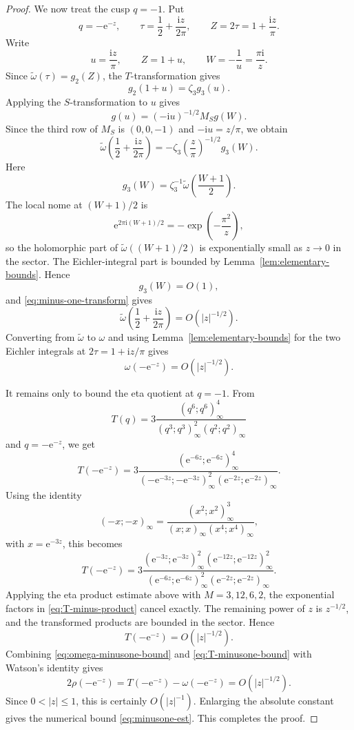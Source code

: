 \documentclass[10pt,a4paper]{amsart}
\newcommand{\ii}{\mathrm i}
\newcommand{\e}{\mathrm e}
\begin{document}
\begin{proof}
We now treat the cusp $q=-1$.  Put
\[
q=-\e^{-z},\qquad \tau=\frac12+\frac{\ii z}{2\pi},\qquad Z=2\tau=1+\frac{\ii z}{\pi}.
\]
Write
\[
u=\frac{\ii z}{\pi},\qquad Z=1+u,
\qquad W=-\frac1u=\frac{\pi\ii}{z}.
\]
Since $\widetilde\omega(\tau)=g_2(Z)$, the $T$-transformation gives
\[
g_2(1+u)=\zeta_3 g_3(u).
\]
Applying the $S$-transformation to $u$ gives
\[
g(u)=(-\ii u)^{-1/2}M_Sg(W).
\]
Since the third row of $M_S$ is $(0,0,-1)$ and $-\ii u=z/\pi$, we obtain
\begin{equation}\label{eq:minus-one-transform}
\widetilde\omega\left(\frac12+\frac{\ii z}{2\pi}\right)
= -\zeta_3\left(\frac{z}{\pi}\right)^{-1/2}g_3(W).
\end{equation}
Here
\[
g_3(W)=\zeta_3^{-1}\widetilde\omega\left(\frac{W+1}{2}\right).
\]
The local nome at $(W+1)/2$ is
\[
\e^{2\pi\ii(W+1)/2}=-\exp\left(-\frac{\pi^2}{z}\right),
\]
so the holomorphic part of $\widetilde\omega((W+1)/2)$ is exponentially small as
$z\to0$ in the sector.  The Eichler-integral part is bounded by Lemma~\ref{lem:elementary-bounds}.  Hence
\[
g_3(W)=O(1),
\]
and \eqref{eq:minus-one-transform} gives
\[
\widetilde\omega\left(\frac12+\frac{\ii z}{2\pi}\right)=O(|z|^{-1/2}).
\]
Converting from $\widetilde\omega$ to $\omega$ and using Lemma~\ref{lem:elementary-bounds} for the two Eichler integrals at $2\tau=1+\ii z/\pi$ gives
\begin{equation}\label{eq:omega-minusone-bound}
\omega(-\e^{-z})=O(|z|^{-1/2}).
\end{equation}

It remains only to bound the eta quotient at $q=-1$.  From
\[
T(q)=3\frac{(q^6;q^6)_\infty^4}{(q^3;q^3)_\infty^2(q^2;q^2)_\infty}
\]
and $q=-\e^{-z}$, we get
\[
T(-\e^{-z})
=3\frac{(\e^{-6z};\e^{-6z})_\infty^4}{(-\e^{-3z};-\e^{-3z})_\infty^2(\e^{-2z};\e^{-2z})_\infty}.
\]
Using the identity
\[
(-x;-x)_\infty=
\frac{(x^2;x^2)_\infty^3}{(x;x)_\infty(x^4;x^4)_\infty},
\]
with $x=\e^{-3z}$, this becomes
\begin{equation}\label{eq:T-minus-product}
T(-\e^{-z})
=
3\frac{(\e^{-3z};\e^{-3z})_\infty^2(\e^{-12z};\e^{-12z})_\infty^2}{(\e^{-6z};\e^{-6z})_\infty^2(\e^{-2z};\e^{-2z})_\infty}.
\end{equation}
Applying the eta product estimate above with $M=3,12,6,2$, the exponential factors in
\eqref{eq:T-minus-product} cancel exactly.  The remaining power of $z$ is $z^{-1/2}$, and the transformed products are bounded in the sector.  Hence
\begin{equation}\label{eq:T-minusone-bound}
T(-\e^{-z})=O(|z|^{-1/2}).
\end{equation}
Combining \eqref{eq:omega-minusone-bound} and \eqref{eq:T-minusone-bound} with Watson's identity gives
\[
2\rho(-\e^{-z})=T(-\e^{-z})-\omega(-\e^{-z})=O(|z|^{-1/2}).
\]
Since $0<|z|\leq1$, this is certainly $O(|z|^{-1})$.  Enlarging the absolute constant gives the numerical bound \eqref{eq:minusone-est}.  This completes the proof.
\end{proof}
\end{document}
